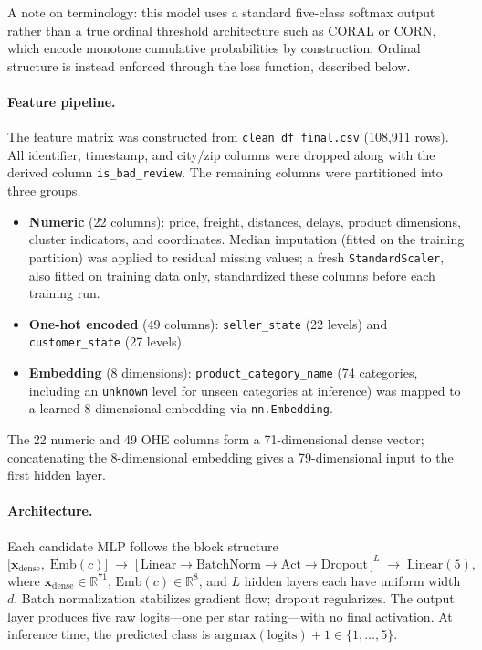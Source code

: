 \documentclass[11pt]{article}
\begin{document}
A note on terminology: this model uses a standard five-class softmax output rather than a true ordinal threshold architecture such as CORAL or CORN, which encode monotone cumulative probabilities by construction. Ordinal structure is instead enforced through the loss function, described below.

\paragraph{Feature pipeline.}
The feature matrix was constructed from \texttt{clean\_df\_final.csv} (108{,}911 rows). All identifier, timestamp, and city/zip columns were dropped along with the derived column \texttt{is\_bad\_review}. The remaining columns were partitioned into three groups.
\begin{itemize}[noitemsep]
  \item \textbf{Numeric} (22 columns): price, freight, distances, delays, product dimensions, cluster indicators, and coordinates. Median imputation (fitted on the training partition) was applied to residual missing values; a fresh \texttt{StandardScaler}, also fitted on training data only, standardized these columns before each training run.
  \item \textbf{One-hot encoded} (49 columns): \texttt{seller\_state} (22 levels) and \texttt{customer\_state} (27 levels).
  \item \textbf{Embedding} (8 dimensions): \texttt{product\_category\_name} (74 categories, including an \texttt{unknown} level for unseen categories at inference) was mapped to a learned 8-dimensional embedding via \texttt{nn.Embedding}.
\end{itemize}
The 22 numeric and 49 OHE columns form a 71-dimensional dense vector; concatenating the 8-dimensional embedding gives a 79-dimensional input to the first hidden layer.

\paragraph{Architecture.}
Each candidate MLP follows the block structure
\[
\bigl[\mathbf{x}_{\mathrm{dense}},\;\mathrm{Emb}(c)\bigr]
\;\longrightarrow\;
\bigl[\,\mathrm{Linear} \to \mathrm{BatchNorm} \to \mathrm{Act} \to \mathrm{Dropout}\,\bigr]^{L}
\;\longrightarrow\;
\mathrm{Linear}(5),
\]
where $\mathbf{x}_{\mathrm{dense}} \in \mathbb{R}^{71}$, $\mathrm{Emb}(c) \in \mathbb{R}^{8}$, and $L$ hidden layers each have uniform width $d$. Batch normalization stabilizes gradient flow; dropout regularizes. The output layer produces five raw logits---one per star rating---with no final activation. At inference time, the predicted class is $\mathrm{argmax}(\mathrm{logits}) + 1 \in \{1,\dots,5\}$.
\end{document}
